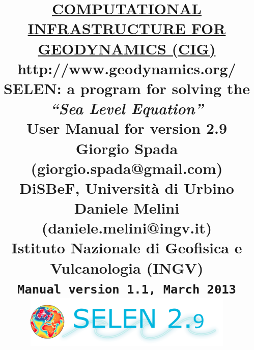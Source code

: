 \documentclass[11pt,fleqn,a4paper,titlepage]{article}
\begin{document}
 

\title{{\underline {\large \textbf{COMPUTATIONAL INFRASTRUCTURE FOR GEODYNAMICS (CIG)}}}\\
\vspace{0.3cm}
\large{http://www.geodynamics.org/} \\
\vspace{1.1cm}
\Huge{{SELEN: a program for solving the \\ \textit{``Sea Level Equation''}}} \\ 
\vspace{0.6cm}
\Large{User Manual for version 2.9} \\
\vspace{0.7cm}
\normalsize{Giorgio Spada (giorgio.spada@gmail.com)} \\
\normalsize{DiSBeF, Universit\`a di Urbino} \\
\vspace{0.55cm}
\normalsize{Daniele Melini (daniele.melini@ingv.it)} \\
\normalsize{Istituto Nazionale di Geofisica e Vulcanologia (INGV)} \\
\vspace{0.55cm}
\vspace{0.7cm}
\texttt{\small{Manual version 1.1, March 2013}}\\
\vspace{0.9cm}
\includegraphics[angle=0,width=0.75\textwidth]{./Figures/logo_SELEN29.png}
\vspace{-0.5cm}
}


\end{document}
